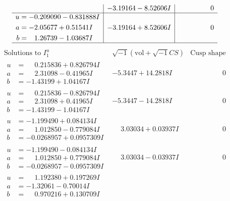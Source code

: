 \documentclass[1p]{elsarticle_modified}
\theoremstyle{definition}
\newcommand{\I}{\sqrt{-1}}
\begin{document}
$$\begin{array}{c|c|c}
 & -3.19164 - 8.52606 I & \phantom{-0.000000 } 0 \\ \hline\begin{aligned}
u &= -0.209090 - 0.831888 I \\
a &= -2.05677 + 0.51541 I \\
b &= \phantom{-}1.26739 - 1.03687 I\end{aligned}
 & -3.19164 + 8.52606 I & \phantom{-0.000000 } 0\\
 \hline 
 \end{array}$$\newpage$$\begin{array}{c|c|c}  
\text{Solutions to }I^u_{1}& \I (\text{vol} + \sqrt{-1}CS) & \text{Cusp shape}\\
 \hline 
\begin{aligned}
u &= \phantom{-}0.215836 + 0.826794 I \\
a &= \phantom{-}2.31098 - 0.41965 I \\
b &= -1.43199 + 1.04167 I\end{aligned}
 & -5.3447 + 14.2818 I & \phantom{-0.000000 } 0 \\ \hline\begin{aligned}
u &= \phantom{-}0.215836 - 0.826794 I \\
a &= \phantom{-}2.31098 + 0.41965 I \\
b &= -1.43199 - 1.04167 I\end{aligned}
 & -5.3447 - 14.2818 I & \phantom{-0.000000 } 0 \\ \hline\begin{aligned}
u &= -1.199490 + 0.084134 I \\
a &= \phantom{-}1.012850 - 0.779084 I \\
b &= -0.0268957 + 0.0957309 I\end{aligned}
 & \phantom{-}3.03034 + 0.03937 I & \phantom{-0.000000 } 0 \\ \hline\begin{aligned}
u &= -1.199490 - 0.084134 I \\
a &= \phantom{-}1.012850 + 0.779084 I \\
b &= -0.0268957 - 0.0957309 I\end{aligned}
 & \phantom{-}3.03034 - 0.03937 I & \phantom{-0.000000 } 0 \\ \hline\begin{aligned}
u &= \phantom{-}1.192380 + 0.197269 I \\
a &= -1.32061 - 0.70014 I \\
b &= \phantom{-}0.970216 + 0.130709 I\end{aligned}

\end{array}$$
\end{document}
